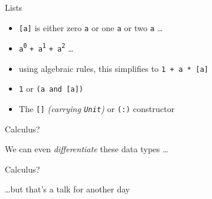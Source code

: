 \begin{frame}
\begin{block}{Lists}
\begin{itemize}
  \item<1-> \lstinline{[a]} is either zero \lstinline{a} or one \lstinline{a} or two \lstinline{a} \ldots
  \item<2-> \lstinline{a}\textsuperscript{\lstinline{0}} \lstinline{+ a}\textsuperscript{\lstinline{1}} \lstinline{+ a}\textsuperscript{\lstinline{2}} \ldots
  \item<3-> using algebraic rules, this simplifies to \lstinline{1 + a * [a]}
  \item<3-> \lstinline{1} or \lstinline{(a and [a])}
  \item<3-> The \lstinline{[]} \emph{(carrying \lstinline{Unit})} or \lstinline{(:)} constructor
\end{itemize}
\end{block}
\end{frame}

\begin{frame}
\begin{block}{Calculus?}
\begin{center}
We can even \emph{differentiate} these data types \ldots
\end{center}
\end{block}
\end{frame}

\begin{frame}
\begin{block}{Calculus?}
\begin{center}
\ldots but that's a talk for another day
\end{center}
\end{block}
\end{frame}
